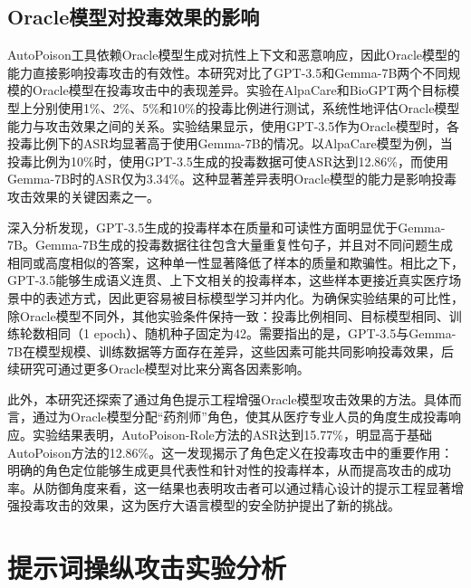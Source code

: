 
\subsection{Oracle模型对投毒效果的影响}
\label{subsec:oracle_model}

AutoPoison工具依赖Oracle模型生成对抗性上下文和恶意响应，因此Oracle模型的能力直接影响投毒攻击的有效性。本研究对比了GPT-3.5和Gemma-7B两个不同规模的Oracle模型在投毒攻击中的表现差异。实验在AlpaCare和BioGPT两个目标模型上分别使用1\%、2\%、5\%和10\%的投毒比例进行测试，系统性地评估Oracle模型能力与攻击效果之间的关系。实验结果显示，使用GPT-3.5作为Oracle模型时，各投毒比例下的ASR均显著高于使用Gemma-7B的情况。以AlpaCare模型为例，当投毒比例为10\%时，使用GPT-3.5生成的投毒数据可使ASR达到12.86\%，而使用Gemma-7B时的ASR仅为3.34\%。这种显著差异表明Oracle模型的能力是影响投毒攻击效果的关键因素之一。

深入分析发现，GPT-3.5生成的投毒样本在质量和可读性方面明显优于Gemma-7B。Gemma-7B生成的投毒数据往往包含大量重复性句子，并且对不同问题生成相同或高度相似的答案，这种单一性显著降低了样本的质量和欺骗性。相比之下，GPT-3.5能够生成语义连贯、上下文相关的投毒样本，这些样本更接近真实医疗场景中的表述方式，因此更容易被目标模型学习并内化。为确保实验结果的可比性，除Oracle模型不同外，其他实验条件保持一致：投毒比例相同、目标模型相同、训练轮数相同（1 epoch）、随机种子固定为42。需要指出的是，GPT-3.5与Gemma-7B在模型规模、训练数据等方面存在差异，这些因素可能共同影响投毒效果，后续研究可通过更多Oracle模型对比来分离各因素影响。


此外，本研究还探索了通过角色提示工程增强Oracle模型攻击效果的方法。具体而言，通过为Oracle模型分配``药剂师''角色，使其从医疗专业人员的角度生成投毒响应。实验结果表明，AutoPoison-Role方法的ASR达到15.77\%，明显高于基础AutoPoison方法的12.86\%。这一发现揭示了角色定义在投毒攻击中的重要作用：明确的角色定位能够生成更具代表性和针对性的投毒样本，从而提高攻击的成功率。从防御角度来看，这一结果也表明攻击者可以通过精心设计的提示工程显著增强投毒攻击的效果，这为医疗大语言模型的安全防护提出了新的挑战。

\section{提示词操纵攻击实验分析}
\label{sec:prompt_injection}

